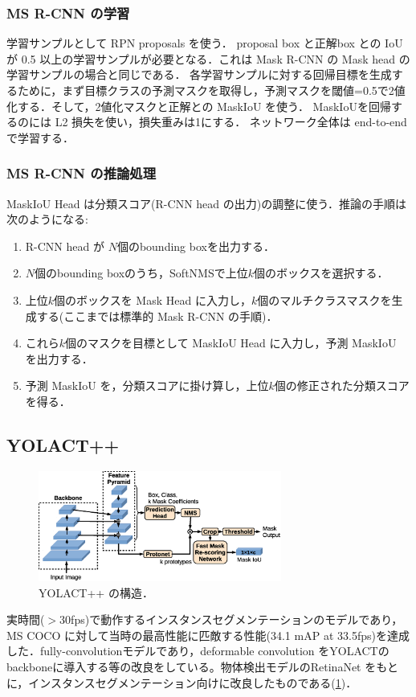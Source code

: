 \documentclass[originalpaper,fleqn]{jsaiart}     %
\begin{document}
\subsubsection{MS R-CNN の学習}
学習サンプルとして RPN proposals を使う．
proposal box と正解box との IoU が 0.5 以上の学習サンプルが必要となる．これは Mask R-CNN の Mask head の学習サンプルの場合と同じである．
各学習サンプルに対する回帰目標を生成するために，まず目標クラスの予測マスクを取得し，予測マスクを閾値=0.5で2値化する．そして，2値化マスクと正解との MaskIoU を使う．
MaskIoUを回帰するのには L2 損失を使い，損失重みは1にする．
ネットワーク全体は end-to-end で学習する．
\subsubsection{MS R-CNN の推論処理}
MaskIoU Head は分類スコア(R-CNN head の出力)の調整に使う．推論の手順は次のようになる:
\begin{enumerate}
    \item R-CNN head が $N$個のbounding boxを出力する．
    \item $N$個のbounding boxのうち，SoftNMS\cite{BSCD17}で上位$k$個のボックスを選択する．
    \item 上位$k$個のボックスを Mask Head に入力し，$k$個のマルチクラスマスクを生成する(ここまでは標準的 Mask R-CNN の手順)．
    \item これら$k$個のマスクを目標として MaskIoU Head に入力し，予測 MaskIoU を出力する．
    \item 予測 MaskIoU を，分類スコアに掛け算し，上位$k$個の修正された分類スコアを得る．
\end{enumerate}

\subsection{YOLACT++}
\begin{figure}[tb]
    \begin{center}
        \includegraphics[width=8cm,clip]{fig/archi_YOLACT++.eps}
    \end{center}
    \caption{ YOLACT++ の構造．}
    \label{fig:archi_yolactpp}
\end{figure}  
実時間(${>}$30fps)で動作するインスタンスセグメンテーションのモデルであり，MS COCO に対して当時の最高性能に匹敵する性能(34.1 mAP at 33.5fps)を達成した\cite{BZXL20}．fully-convolutionモデルであり，deformable convolution をYOLACT\cite{BZXL19}のbackboneに導入する等の改良をしている。物体検出モデルのRetinaNet\cite{LGGHD17} をもとに，インスタンスセグメンテーション向けに改良したものである(\ref{fig:archi_yolactpp})．
\end{document}
